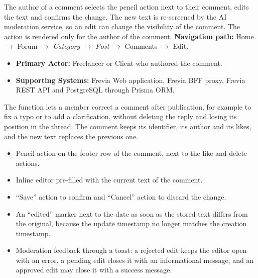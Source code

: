 The author of a comment selects the pencil action next to their comment, edits the text and
confirms the change. The new text is re-screened by the AI moderation service, so an edit can
change the visibility of the comment. The action is rendered only for the author of the
comment.\newline
\textbf{Navigation path:} Home $\rightarrow$ Forum $\rightarrow$ \textit{Category} $\rightarrow$
\textit{Post} $\rightarrow$ Comments $\rightarrow$ Edit.


\begin{itemize}[leftmargin=1.6em,topsep=3pt,itemsep=2pt,parsep=0pt,label=$\bullet$]
      \item \textbf{Primary Actor:} Freelancer or Client who authored the comment.
      \item \textbf{Supporting Systems:} Frevia Web application, Frevia BFF proxy, Frevia REST API
            and PostgreSQL through Prisma ORM.
\end{itemize}

\noindent The function lets a member correct a comment after publication, for example to fix a
typo or to add a clarification, without deleting the reply and losing its position in the
thread. The comment keeps its identifier, its author and its likes, and the new text replaces the
previous one.

\begin{itemize}[leftmargin=1.6em,topsep=3pt,itemsep=2pt,parsep=0pt,label=$\bullet$]
      \item Pencil action on the footer row of the comment, next to the like and delete
            actions.
      \item Inline editor pre-filled with the current text of the comment.
      \item ``Save'' action to confirm and ``Cancel'' action to discard the change.
      \item An ``edited'' marker next to the date as soon as the stored text differs from
            the original, because the update timestamp no longer matches the creation
            timestamp.
      \item Moderation feedback through a toast: a rejected edit keeps the editor open with
            an error, a pending edit closes it with an informational message, and an
            approved edit may close it with a success message.
\end{itemize}

